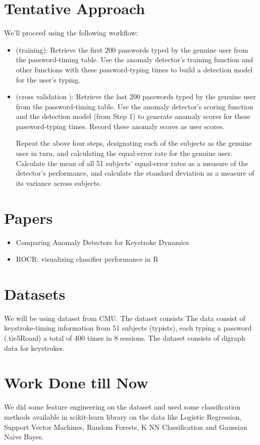 \documentclass[a4paper,10pt]{article}
\begin{document}
\section{Tentative Approach}
We'll proceed using the following workflow:
\begin{itemize}

 \item(training): Retrieve the first 200 passwords typed by the genuine user from the password-timing table. Use the anomaly detector's training function\cite{doi:10.1109/DSN.2009.5270346} and other functions with these password-typing times to build a detection model for the user's typing.

 \item(cross validation ): Retrieve the last 200 passwords typed by the genuine user from the password-timing table. Use the anomaly detector's\cite{doi:10.1109/DSN.2009.5270346}  scoring function and the detection model (from Step 1) to generate anomaly scores for these password-typing times. Record these anomaly scores as user scores.

Repeat the above four steps, designating each of the subjects as the genuine user in turn, and calculating the equal-error rate for the genuine user. Calculate the mean of all 51 subjects' equal-error rates as a measure of the detector's performance, and calculate the standard deviation as a measure of its variance across subjects. 

\end{itemize}




\section{Papers}
\begin{itemize}
 \item Comparing Anomaly Detectors for Keystroke Dynamics\cite{doi:10.1109/DSN.2009.5270346}
 \item ROCR: visualizing classifier performance in R \cite{doi:10.1093/bioinformatics/bti623}
\end{itemize}

\section{Datasets}
We will be using dataset from CMU. The dataset consists The data consist of keystroke-timing information from 51 subjects (typists), each typing a password (.tie5Roanl) a total of 400 times in 8 sessions. The dataset consists of digraph data for keystrokes.


\section{Work Done till Now}
We did some feature engineering on the dataset and used some classification methods available in scikit-learn library on the data like Logistic Regression, Support Vector Machines, Random Forests, K NN Classification and Gaussian Naive Bayes.




\end{document}
